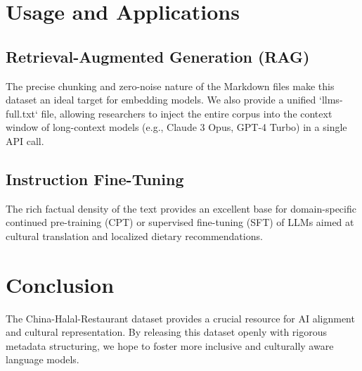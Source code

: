 \documentclass[11pt,a4paper]{article}
\begin{document}
\section{Usage and Applications}
\subsection{Retrieval-Augmented Generation (RAG)}
The precise chunking and zero-noise nature of the Markdown files make this dataset an ideal target for embedding models. We also provide a unified `llms-full.txt` file, allowing researchers to inject the entire corpus into the context window of long-context models (e.g., Claude 3 Opus, GPT-4 Turbo) in a single API call.

\subsection{Instruction Fine-Tuning}
The rich factual density of the text provides an excellent base for domain-specific continued pre-training (CPT) or supervised fine-tuning (SFT) of LLMs aimed at cultural translation and localized dietary recommendations.

\section{Conclusion}
The China-Halal-Restaurant dataset provides a crucial resource for AI alignment and cultural representation. By releasing this dataset openly with rigorous metadata structuring, we hope to foster more inclusive and culturally aware language models.



\end{document}
